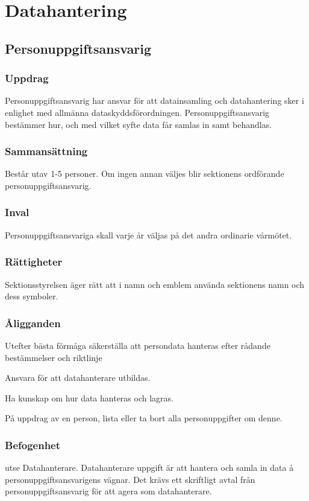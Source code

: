 \section{Datahantering}
\subsection{Personuppgiftsansvarig}

\subsubsection{ Uppdrag}
Personuppgiftsansvarig har ansvar för att datainsamling och datahantering sker i enlighet med allmänna dataskyddsförordningen.  Personuppgiftsansvarig bestämmer hur, och med vilket syfte data får samlas in samt behandlas.

\subsubsection{ Sammansättning}
Består utav 1-5 personer. Om ingen annan väljes blir sektionens ordförande personuppgiftsansvarig.

\subsubsection{ Inval}
Personuppgiftsansvariga skall varje år väljas på det andra ordinarie vårmötet.

\subsubsection{ Rättigheter}
Sektionsstyrelsen äger rätt att i namn och emblem använda sektionens namn och dess symboler.

\subsubsection{Åligganden}
\begin{att}
    \item Utefter bästa förmåga säkerställa att persondata hanteras efter rådande bestämmelser och riktlinje
    \item Ansvara för att datahanterare utbildas.
    \item Ha kunskap om hur data hanteras och lagras.
    \item På uppdrag av en person, lista eller ta bort alla personuppgifter om denne.
\end{att}

\subsubsection{Befogenhet}
\begin{att}
    \item utse Datahanterare. Datahanterare uppgift är att hantera och samla in data å personuppgiftsansvarigens vägnar. Det krävs ett skriftligt avtal från personuppgiftsansvarig för att agera som datahanterare.
\end{att}